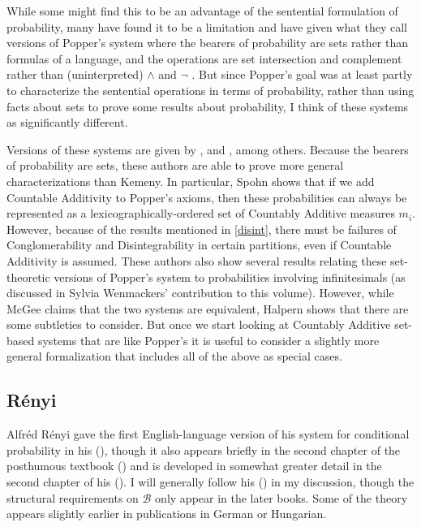 While some might find this to be an advantage of the sentential formulation of probability, many have found it to be a limitation and have given what they call versions of Popper's system where the bearers of probability are sets rather than formulas of a language, and the operations are set intersection and complement rather than (uninterpreted) $\land$ and $\lnot$ \citep{randl, independence}. But since Popper's goal was at least partly to characterize the sentential operations in terms of probability, rather than using facts about sets to prove some results about probability, I think of these systems as significantly different.

Versions of these systems are given by \citet{fraassenrep,spohnrep,learnimp}, and \citet{halpern}, among others. Because the bearers of probability are sets, these authors are able to prove more general characterizations than Kemeny. In particular, Spohn shows that if we add Countable Additivity to Popper's axioms, then these probabilities can always be represented as a lexicographically-ordered set of Countably Additive measures $m_i$. However, because of the results mentioned in \autoref{disint}, there must be failures of Conglomerability and Disintegrability in certain partitions, even if Countable Additivity is assumed. These authors also show several results relating these set-theoretic versions of Popper's system to probabilities involving infinitesimals (as discussed in Sylvia Wenmackers' contribution to this volume). However, while McGee claims that the two systems are equivalent, Halpern shows that there are some subtleties to consider. But once we start looking at Countably Additive set-based systems that are like Popper's it is useful to consider a slightly more general formalization that includes all of the above as special cases.

\subsection{R\'{e}nyi}\label{renyi}

Alfr\'{e}d R\'{e}nyi gave the first English-language version of his system for conditional probability in his (\citeyear{renyinew}), though it also appears briefly in the second chapter of the posthumous textbook (\citeyear{renyi}) and is developed in somewhat greater detail in the second chapter of his (\citeyear{renyiprob}). I will generally follow his (\citeyear{renyinew}) in my discussion, though the structural requirements on $\mathcal{B}$ only appear in the later books. Some of the theory appears slightly earlier in publications in German or Hungarian.

